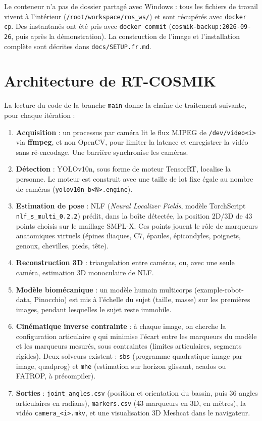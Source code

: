 \documentclass[11pt,a4paper]{article}
\newcommand{\code}[1]{\texttt{\small #1}}
\begin{document}
Le conteneur n'a pas de dossier partagé avec Windows : tous les fichiers de travail vivent à l'intérieur (\code{/root/workspace/ros\_ws/}) et sont récupérés avec \code{docker cp}. Des instantanés ont été pris avec \code{docker commit} (\code{cosmik-backup:2026-09-26}, puis après la démonstration). La construction de l'image et l'installation complète sont décrites dans \code{docs/SETUP.fr.md}.

\section{Architecture de RT-COSMIK}

La lecture du code de la branche \code{main} donne la chaîne de traitement suivante, pour chaque itération :

\begin{enumerate}
  \item \textbf{Acquisition} : un processus par caméra lit le flux MJPEG de \code{/dev/video<i>} via \textbf{ffmpeg}, et non OpenCV, pour limiter la latence et enregistrer la vidéo sans ré-encodage. Une barrière synchronise les caméras.
  \item \textbf{Détection} : YOLOv10n, sous forme de moteur TensorRT, localise la personne. Le moteur est construit avec une taille de lot fixe égale au nombre de caméras (\code{yolov10n\_b<N>.engine}).
  \item \textbf{Estimation de pose} : NLF (\emph{Neural Localizer Fields}, modèle TorchScript \code{nlf\_s\_multi\_0.2.2}) prédit, dans la boîte détectée, la position 2D/3D de 43 points choisis sur le maillage SMPL-X. Ces points jouent le rôle de marqueurs anatomiques virtuels (épines iliaques, C7, épaules, épicondyles, poignets, genoux, chevilles, pieds, tête).
  \item \textbf{Reconstruction 3D} : triangulation entre caméras, ou, avec une seule caméra, estimation 3D monoculaire de NLF.
  \item \textbf{Modèle biomécanique} : un modèle humain multicorps (example-robot-data, Pinocchio) est mis à l'échelle du sujet (taille, masse) sur les premières images, pendant lesquelles le sujet reste immobile.
  \item \textbf{Cinématique inverse contrainte} : à chaque image, on cherche la configuration articulaire $q$ qui minimise l'écart entre les marqueurs du modèle et les marqueurs mesurés, sous contraintes (limites articulaires, segments rigides). Deux solveurs existent : \code{sbs} (programme quadratique image par image, quadprog) et \code{mhe} (estimation sur horizon glissant, acados ou FATROP, à précompiler).
  \item \textbf{Sorties} : \code{joint\_angles.csv} (position et orientation du bassin, puis 36 angles articulaires en radians), \code{markers.csv} (43 marqueurs en 3D, en mètres), la vidéo \code{camera\_<i>.mkv}, et une visualisation 3D Meshcat dans le navigateur.
\end{enumerate}
\end{document}
